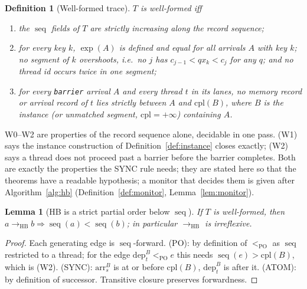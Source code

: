 \documentclass[11pt]{article}
\newtheorem{lemma}[theorem]{Lemma}
\newtheorem{definition}[theorem]{Definition}
\theoremstyle{remark}
\DeclareMathOperator{\seq}{seq}
\newcommand{\HB}{\to_{\mathrm{HB}}}
\newcommand{\PO}{<_{\mathrm{PO}}}
\newcommand{\arr}[2]{\mathrm{arr}^{#2}_{#1}}
\newcommand{\dep}[2]{\mathrm{dep}^{#2}_{#1}}
\begin{document}
\begin{definition}[Well-formed trace]\label{def:wf}
$T$ is \emph{well-formed} iff
\begin{enumerate}
\item[(W0)] the $\seq$ fields of $T$ are strictly increasing along the record
      sequence;
\item[(W1)] for every key $k$, $\exp(A)$ is defined and equal for all
      arrivals $A$ with key $k$; no segment of $k$ overshoots, i.e.\ no $j$
      has $c_{j-1}<qx_k<c_j$ for any $q$; and no thread id occurs twice in one
      segment;
\item[(W2)] for every \texttt{barrier} arrival $A$ and every thread $t$ in
      its lanes, no memory record or arrival record of $t$ lies strictly
      between $A$ and $\mathrm{cpl}(B)$, where $B$ is the instance (or
      unmatched segment, $\mathrm{cpl}=+\infty$) containing $A$.
\end{enumerate}
\end{definition}

W0--W2 are properties of the record sequence alone, decidable in one pass.
(W1) says the instance construction of Definition~\ref{def:instance} closes
exactly; (W2) says a thread does not proceed past a barrier before the
barrier completes. Both are exactly the properties the SYNC rule needs; they
are stated here so that the theorems have a readable hypothesis; a monitor
that decides them is given after Algorithm~\ref{alg:hb}
(Definition~\ref{def:monitor}, Lemma~\ref{lem:monitor}).

\begin{lemma}[HB is a strict partial order below $\seq$]\label{lem:seq}
If $T$ is well-formed, then $a\HB b\Rightarrow\seq(a)<\seq(b)$; in particular
$\HB$ is irreflexive.
\end{lemma}
\begin{proof}
Each generating edge is $\seq$-forward. (PO): by definition of $\PO$ as
$\seq$ restricted to a thread; for the edge $\dep{t}{B}\PO e$ this needs
$\seq(e)>\mathrm{cpl}(B)$, which is (W2). (SYNC):
$\arr{s}{B}$ is at or before $\mathrm{cpl}(B)$, $\dep{t}{B}$ is after it.
(ATOM): by definition of successor. Transitive closure preserves
forwardness.
\end{proof}
\end{document}
